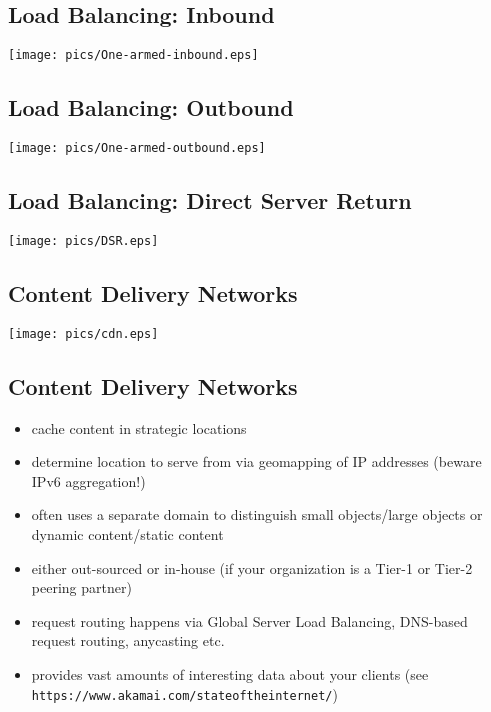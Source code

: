 \documentclass[xga]{xdvislides}
\begin{document}
\subsection{Load Balancing: Inbound}
\begin{center}
	\texttt{[image: pics/One-armed-inbound.eps]}
\end{center}

\subsection{Load Balancing: Outbound}
\begin{center}
	\texttt{[image: pics/One-armed-outbound.eps]}
\end{center}

\subsection{Load Balancing: Direct Server Return}
\begin{center}
	\texttt{[image: pics/DSR.eps]}
\end{center}

\subsection{Content Delivery Networks}
\begin{center}
	\texttt{[image: pics/cdn.eps]}
\end{center}

\subsection{Content Delivery Networks}
\begin{itemize}
	\item cache content in strategic locations
	\item determine location to serve from via geomapping of IP
		addresses (beware IPv6 aggregation!)
	\item often uses a separate domain to distinguish small
		objects/large objects or dynamic content/static content
	\item either out-sourced or in-house (if your organization is a
		Tier-1 or Tier-2 peering partner)
	\item request routing happens via Global Server Load Balancing,
		DNS-based request routing, anycasting etc.
	\item provides vast amounts of interesting data about your clients
		(see \verb+https://www.akamai.com/stateoftheinternet/+)
\end{itemize}
\end{document}
